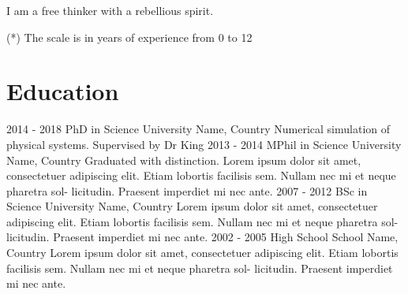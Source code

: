 \documentclass[11pt,a4paper]{smooth-banner-cv}
\begin{document}
\begin{sidebar}
  
  {\justifying I am a free thinker with a rebellious spirit.}




  
  {\footnotesize\noindent\hspace{-5pt}(*) The scale is in years of
    experience from 0 to 12}
    
\end{sidebar}


\maketoptitle


\section{Education}

\begin{richlist}
  \richlistitem
      {2014 - 2018}
      {PhD in Science}
      {University Name, Country}
      {Numerical simulation of physical systems.
      \newline Supervised by Dr King}
   \richlistitem
       {2013 - 2014}
       {MPhil in Science}
       {University Name, Country}
       {Graduated with distinction.
         \newline Lorem ipsum dolor sit amet, consectetuer adipiscing elit. Etiam
         lobortis facilisis sem. Nullam nec mi et neque pharetra sol-
         licitudin. Praesent imperdiet mi nec ante.}
    \richlistitem
       {2007 - 2012}
       {BSc in Science}
       {University Name, Country}
       {Lorem ipsum dolor sit amet, consectetuer adipiscing elit. Etiam
         lobortis facilisis sem. Nullam nec mi et neque pharetra sol-
         licitudin. Praesent imperdiet mi nec ante.}
    \richlistitem
        {2002 - 2005}
        {High School}
        {School Name, Country}
        {Lorem ipsum dolor sit amet, consectetuer adipiscing elit. Etiam
          lobortis facilisis sem. Nullam nec mi et neque pharetra sol-
          licitudin. Praesent imperdiet mi nec ante.}
\end{richlist}
\end{document}
